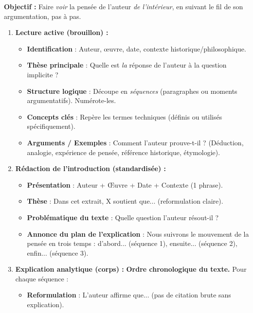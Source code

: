 \documentclass[11pt]{article}
\begin{document}
\begin{methode}
    \textbf{Objectif :} Faire \emph{voir} la pensée de l'auteur \emph{de l'intérieur}, en suivant le fil de son argumentation, pas à pas.
    \begin{enumerate}
        \item \textbf{Lecture active (brouillon) :} \begin{itemize}
            \item \textbf{Identification} : Auteur, œuvre, date, contexte historique/philosophique.
            \item \textbf{Thèse principale} : Quelle est \emph{la} réponse de l'auteur à la question implicite ?
            \item \textbf{Structure logique} : Découpe en \emph{séquences} (paragraphes ou moments argumentatifs). Numérote-les.
            \item \textbf{Concepts clés} : Repère les termes techniques (définis ou utilisés spécifiquement).
            \item \textbf{Arguments / Exemples} : Comment l'auteur prouve-t-il ? (Déduction, analogie, expérience de pensée, référence historique, étymologie).
        \end{itemize}
        \item \textbf{Rédaction de l'introduction (standardisée) :}
        \begin{itemize}
            \item \textbf{Présentation} : Auteur + Œuvre + Date + Contexte (1 phrase).
            \item \textbf{Thèse} : \guillemotleft Dans cet extrait, X soutient que... \guillemotright (reformulation claire).
            \item \textbf{Problématique du texte} : Quelle question l'auteur résout-il ?
            \item \textbf{Annonce du plan de l'explication} : \guillemotleft Nous suivrons le mouvement de la pensée en trois temps : d'abord... (séquence 1), ensuite... (séquence 2), enfin... (séquence 3). \guillemotright
        \end{itemize}
        \item \textbf{Explication analytique (corps) :} \textbf{Ordre chronologique du texte.} Pour chaque séquence :
        \begin{itemize}
            \item \textbf{Reformulation} : \guillemotleft L'auteur affirme que... \guillemotright (pas de citation brute sans explication).

\end{itemize}
\end{enumerate}
\end{methode}
\end{document}
